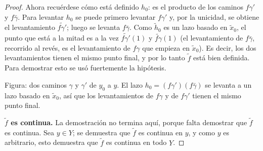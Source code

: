 \documentclass[11pt]{article}
\begin{document}
\begin{proof}
Ahora recuérdese cómo está definido $h_0$: es el producto de los caminos $f\gamma'$ y $f\bar\gamma$. Para levantar $h_0$ se puede primero levantar $f\gamma'$ y, por la unicidad, se obtiene el levantamiento $\widetilde{f\gamma'}$; luego se levanta $f\bar\gamma$. Como $\tilde h_0$ es un lazo basado en $\tilde x_0$, el punto que está a la mitad es a la vez $\widetilde{f\gamma'}(1)$ y $\widetilde{f\gamma}(1)$ (el levantamiento de $f\bar\gamma$, recorrido al revés, es el levantamiento de $f\gamma$ que empieza en $\tilde x_0$). Es decir, los dos levantamientos tienen el mismo punto final, y por lo tanto $\tilde f$ está bien definida. Para demostrar esto se usó fuertemente la hipótesis.

\begin{center}
\end{center}

\noindent Figura: dos caminos $\gamma$ y $\gamma'$ de $y_0$ a $y$. El lazo $h_0=(f\gamma')(f\bar\gamma)$ se levanta a un lazo basado en $\tilde x_0$, así que los levantamientos de $f\gamma$ y de $f\gamma'$ tienen el mismo punto final.

\medskip\noindent\textbf{$\tilde f$ es continua.} La demostración no termina aquí, porque falta demostrar que $\tilde f$ es continua. Sea $y\in Y$; se demuestra que $\tilde f$ es continua en $y$, y como $y$ es arbitrario, esto demuestra que $\tilde f$ es continua en todo $Y$.


\end{proof}
\end{document}
